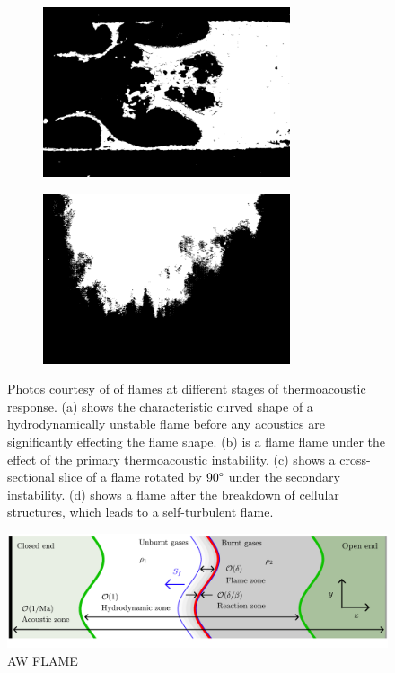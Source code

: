 \begin{figure}[t]
    \begin{subfigure}{0.49\textwidth}
    \centering
    \includegraphics[height=5cm]{assets/imgs/Searby-92-flame_c.png}
    \caption{}
    \label{fig:Searby-92_flames_c}
    \end{subfigure}
    \hfill
    \begin{subfigure}{0.49\textwidth}
    \centering
    \includegraphics[height=5cm]{assets/imgs/Searby-92-flame_d.png}
    \caption{}
    \label{fig:Searby-92_flames_d}
    \end{subfigure}
\caption{Photos courtesy of \cite{searby1992AcousticInstabilityPremixed} of flames at different stages of thermoacoustic response. (a) shows the characteristic curved shape of a hydrodynamically unstable flame before any acoustics are significantly effecting the flame shape. (b) is a flame flame under the effect of the primary thermoacoustic instability. (c) shows a cross-sectional slice of a flame rotated by $90\degree$ under the secondary instability. (d) shows a flame after the breakdown of cellular structures, which leads to a self-turbulent flame.}
\label{fig:Searby-92_flames}
\end{figure}





\begin{figure}[t]
\centering
\includegraphics[scale=0.6]{assets/imgs/AW-flame.pdf}
\caption{AW FLAME}
\label{fig:AW-flame}
\end{figure}

